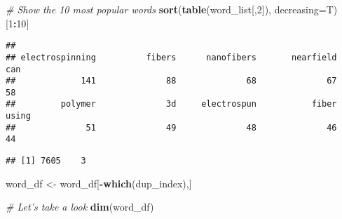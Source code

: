 \documentclass[
  a4paper]{article}
\newenvironment{Shaded}{\begin{snugshade}}{\end{snugshade}}
\newcommand{\CommentTok}[1]{\textcolor[rgb]{0.56,0.35,0.01}{\textit{#1}}}
\newcommand{\DataTypeTok}[1]{\textcolor[rgb]{0.13,0.29,0.53}{#1}}
\newcommand{\DecValTok}[1]{\textcolor[rgb]{0.00,0.00,0.81}{#1}}
\newcommand{\KeywordTok}[1]{\textcolor[rgb]{0.13,0.29,0.53}{\textbf{#1}}}
\newcommand{\NormalTok}[1]{#1}
\newcommand{\OperatorTok}[1]{\textcolor[rgb]{0.81,0.36,0.00}{\textbf{#1}}}
\newcommand{\StringTok}[1]{\textcolor[rgb]{0.31,0.60,0.02}{#1}}
\begin{document}
\begin{Shaded}
\begin{Highlighting}[]
\CommentTok{# Show the 10 most popular words}
\KeywordTok{sort}\NormalTok{(}\KeywordTok{table}\NormalTok{(word_list[,}\DecValTok{2}\NormalTok{]), }\DataTypeTok{decreasing=}\NormalTok{T)[}\DecValTok{1}\OperatorTok{:}\DecValTok{10}\NormalTok{]}
\end{Highlighting}
\end{Shaded}

\begin{verbatim}
## 
## electrospinning          fibers      nanofibers       nearfield             can 
##             141              88              68              67              58 
##         polymer              3d     electrospun           fiber           using 
##              51              49              48              46              44
\end{verbatim}

\begin{Shaded}
\end{Shaded}

\begin{verbatim}
## [1] 7605    3
\end{verbatim}

\begin{Shaded}
\begin{Highlighting}[]
\NormalTok{word_df <-}\StringTok{ }\NormalTok{word_df[}\OperatorTok{-}\KeywordTok{which}\NormalTok{(dup_index),]}

\CommentTok{# Let's take a look}
\KeywordTok{dim}\NormalTok{(word_df)}
\end{Highlighting}
\end{Shaded}
\end{document}
